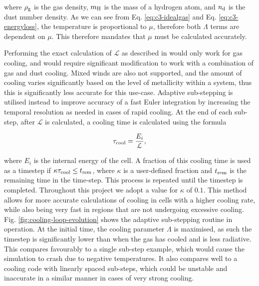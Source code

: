 \noindent
where $\rho_\text{g}$ is the gas density,
$m_\text{H}$ is the mass of a hydrogen atom,
and
$n_\text{d}$ is the dust number density.
As we can see from Eq. \ref{eq:c3-idealgas} and Eq. \ref{eq:c3-energyloss}, the temperature is proportional to $\mu$, therefore both $\Lambda$ terms are dependent on $\mu$.
This therefore mandates that $\mu$ must be calculated accurately.


Performing the exact calculation of $\mathcal{L}$ as described in \textcite{townsendExactIntegrationScheme2009} would only work for gas cooling, and would require significant modification to work with a combination of gas and dust cooling.
Mixed winds are also not supported, and the amount of cooling varies significantly based on the level of metallicity within a system, thus this is significantly less accurate for this use-case.
Adaptive sub-stepping is utilised instead to improve accuracy of a fast Euler integration by increasing the temporal resolution as needed in cases of rapid cooling.
At the end of each sub-step, after $\mathcal{L}$ is calculated, a cooling time is calculated using the formula

\begin{equation}
  \tau_\text{cool} = \frac{E_i}{\mathcal{L}} ,
\end{equation}

\noindent
where $E_i$ is the internal energy of the cell.
A fraction of this cooling time is used as a timestep if $\kappa \tau_\text{cool} \leq t_\text{rem}$, where $\kappa$ is a user-defined fraction and $t_\text{rem}$ is the remaining time in the time-step.
This process is repeated until the timestep is completed.
Throughout this project we adopt a value for $\kappa$ of $0.1$.
This method allows for more accurate calculations of cooling in cells with a higher cooling rate, while also being very fast in regions that are not undergoing excessive cooling.
Fig. \ref{fig:cooling-loop-evolution} shows the adaptive sub-stepping routine in operation.
At the initial time, the cooling parameter $\Lambda$ is maximised, as such the timestep is significantly lower than when the gas has cooled and is less radiative.
This compares favourably to a single sub-step example, which would cause the simulation to crash due to negative temperatures.
It also compares well to a cooling code with linearly spaced sub-steps, which could be unstable and inaccurate in a similar manner in cases of very strong cooling.

